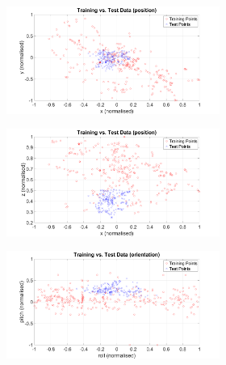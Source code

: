 \begin{figure}
  \centering
  \begin{subfigure}{\textwidth}
    \begin{subfigure}{0.48\textwidth}
      \includegraphics[clip, trim = 80 0 100 0, width=\textwidth]{figures/chapter5/trts_xy}
    \end{subfigure}
    \begin{subfigure}{0.48\textwidth}
      \includegraphics[clip, trim = 80 0 100 0, width=\textwidth]{figures/chapter5/trts_xz}
    \end{subfigure}
    \caption{}
  \end{subfigure}
  \begin{subfigure}{\textwidth}
    \begin{subfigure}{0.48\textwidth}
      \includegraphics[clip, trim = 80 0 100 0, width=\textwidth]{figures/chapter5/trts_rollpitch}

\end{subfigure}
\end{subfigure}
\end{figure}
